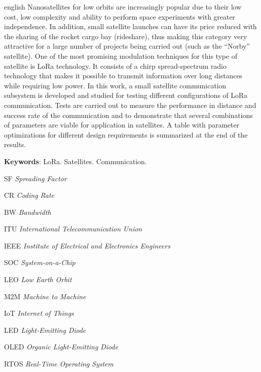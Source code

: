 \documentclass[
	12pt,				%
	openright,			%
	twoside,			%
	a4paper,			%
	english,			%
	french,				%
	spanish,			%
	brazil				%
	]{abntex2}
\begin{document}
\begin{resumo}[Abstract]
 \begin{otherlanguage*}{english}
Nanosatellites for low orbits are increasingly popular due to their low cost, low complexity and ability to perform space experiments with greater independence. In addition, small satellite launches can have its price reduced with the sharing of the rocket cargo bay (rideshare), thus making this category very attractive for a large number of projects being carried out (such as the “Norby” satellite). One of the most promising modulation techniques for this type of satellite is LoRa technology. It consists of a chirp spread-spectrum radio technology that makes it possible to transmit information over long distances while requiring low power. In this work, a small satellite communication subsystem is developed and studied for testing different configurations of LoRa communication. Tests are carried out to measure the performance in distance and success rate of the communication and to demonstrate that several combinations of parameters are viable for application in satellites. A table with parameter optimizations for different design requirements is summarized at the end of the results.

   \vspace{\onelineskip}
 
   \noindent 
   \textbf{Keywords}: LoRa. Satellites. Communication.
 \end{otherlanguage*}
\end{resumo}

\listoffigures*
\cleardoublepage

\listoftables*
\cleardoublepage

\begin{siglas}
  \item[SF] \emph{Spreading Factor}
  \item[CR] \emph{Coding Rate}
  \item[BW] \emph{Bandwidth}
  \item[ITU] \emph{International Telecommunication Union}
  \item[IEEE] \emph{Institute of Electrical and Electronics Engineers}
  \item[SOC] \emph{System-on-a-Chip}
  \item[LEO] \emph{Low Earth Orbit}
  \item[M2M] \emph{Machine to Machine}
  \item[IoT] \emph{Internet of Things}
  \item[LED] \emph{Light-Emitting Diode}
  \item[OLED] \emph{Organic Light-Emitting Diode}
  \item[RTOS] \emph{Real-Time Operating System}
\end{siglas}
\end{document}
